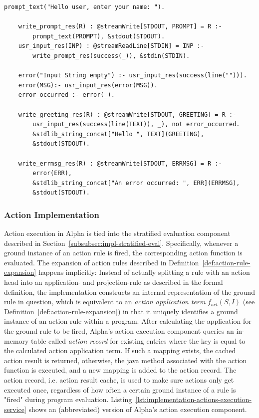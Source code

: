 \begin{example}
\begin{lstlisting}[style=asp-code, label={lst:implementation-actions-supported1}, caption={A supported version of the "greeter" application.}]
    prompt_text("Hello user, enter your name: ").
        
    write_prompt_res(R) : @streamWrite[STDOUT, PROMPT] = R :- 
        prompt_text(PROMPT), &stdout(STDOUT).
    usr_input_res(INP) : @streamReadLine[STDIN] = INP :- 
        write_prompt_res(success(_)), &stdin(STDIN).

    error("Input String empty") :- usr_input_res(success(line(""))).
    error(MSG):- usr_input_res(error(MSG)).
    error_occurred :- error(_).  

    write_greeting_res(R) : @streamWrite[STDOUT, GREETING] = R :- 
        usr_input_res(success(line(TEXT)), _), not error_occurred.
        &stdlib_string_concat["Hello ", TEXT](GREETING),
        &stdout(STDOUT).
        
    write_errmsg_res(R) : @streamWrite[STDOUT, ERRMSG] = R :-
        error(ERR),
        &stdlib_string_concat["An error occurred: ", ERR](ERRMSG),
        &stdout(STDOUT).
\end{lstlisting} 
\end{example}     

\subsubsection{Action Implementation}
\label{subsucsec:implementation-actions-execution}

Action execution in Alpha is tied into the stratified evaluation component described in Section~\ref{subsubsec:impl-stratified-eval}. Specifically, whenever a ground instance of an action rule is fired, the corresponding action function is evaluated. The expansion of action rules described in Definition~\ref{def:action-rule-expansion} happens implicitly:
Instead of actually splitting a rule with an action head into an application- and projection-rule as described in the formal definition, the implementation constructs an internal representation of the ground rule in question, which is equivalent to an \emph{action application term} $f_{act}(S, I)$ (see Definition~\ref{def:action-rule-expansion}) in that it uniquely identifies a ground instance of an action rule within a program. After calculating the application for the ground rule to be fired, Alpha's action execution component queries an in-memory table called \emph{action record} for existing entries where the key is equal to the calculated action application term. If such a mapping exists, the cached action result is returned, otherwise, the java method associated with the action function is executed, and a new mapping is added to the action record. The action record, i.e. action result cache, is used to make sure actions only get executed once, regardless of how often a certain ground instance of a rule is "fired" during program evaluation. Listing~\ref{lst:implementation-actions-execution-service} shows an (abbreviated) version of Alpha's action execution component.

